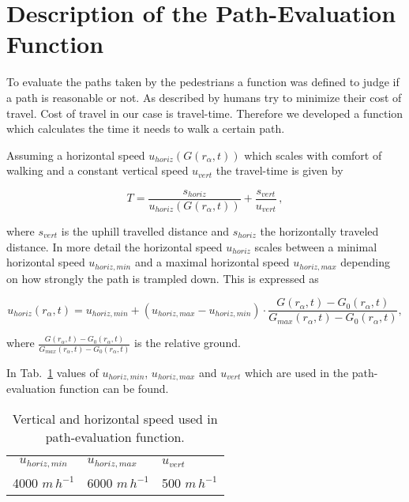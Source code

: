 \section{Description of the Path-Evaluation Function}

To evaluate the paths taken by the pedestrians a function was defined to judge if a path is reasonable or not. As described by \citet{koelbl_helbing:2003} humans try to minimize their cost of travel. Cost of travel in our case is travel-time. Therefore we developed a function which calculates the time it needs to walk a certain path.

Assuming a horizontal speed $u_{horiz}(G(r_{\alpha},t))$ which scales with comfort of walking and a constant vertical speed $u_{vert}$ the travel-time is given by

\begin{equation}
\label{eq:time}
T= \frac{s_{horiz}}{u_{horiz}(G(r_{\alpha},t))} + \frac{s_{vert}}{u_{vert}} \,,
\end{equation}

where $s_{vert}$ is the uphill travelled distance and $s_{horiz}$ the horizontally traveled distance. In more detail the horizontal speed $u_{horiz}$ scales between a minimal horizontal speed $u_{horiz,min}$ and a maximal horizontal speed $u_{horiz,max}$ depending on how strongly the path is trampled down. This is expressed as

\begin{equation}
u_{horiz}(r_{\alpha},t) = u_{horiz,min} + (u_{horiz,max}-u_{horiz,min}) \cdot \frac{G(r_{\alpha},t)-G_{0}(r_{\alpha},t)}{G_{max}(r_{\alpha},t)-G_{0}(r_{\alpha},t)},
\end{equation}

where $\frac{G(r_{\alpha},t)-G_{0}(r_{\alpha},t)}{G_{max}(r_{\alpha},t)-G_{0}(r_{\alpha},t)}$ is the relative ground.

In Tab.\ \ref{table_speed} values of $u_{horiz,min}$, $u_{horiz,max}$ and $u_{vert}$ which are used in the path-evaluation function can be found.

\begin{table}[h]
\begin{center}
 \setlength{\abovecaptionskip}{0pt}
 \setlength{\belowcaptionskip}{10pt}
\caption{Vertical and horizontal speed used in path-evaluation function.}
\begin{tabular}{c l l}
  \hline
  $u_{horiz,min}$ & $u_{horiz,max}$ & $u_{vert}$ \\
  4000 $m\,h^{-1}$ & 6000 $m\,h^{-1}$ & 500 $m\,h^{-1}$ \\ \hline
\end{tabular}
\label{table_speed}
\end{center}
\end{table}